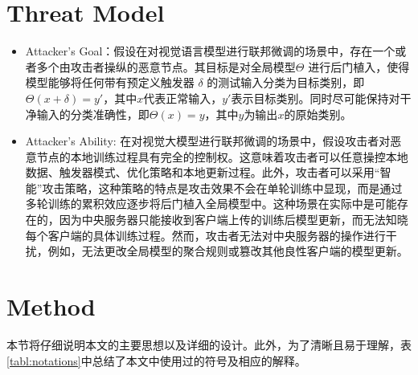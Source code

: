 \documentclass[lettersize,journal]{IEEEtran}
\begin{document}
\section{Threat Model}
\begin{itemize}
    \item Attacker's Goal：假设在对视觉语言模型进行联邦微调的场景中，存在一个或者多个由攻击者操纵的恶意节点。其目标是对全局模型$\Theta$ 进行后门植入，使得模型能够将任何带有预定义触发器 $\delta$ 的测试输入分类为目标类别，即$\Theta(x+\delta) = y'$，其中$x$代表正常输入，$y'$表示目标类别。同时尽可能保持对干净输入的分类准确性，即$\Theta(x) = y$，其中$y$为输出$x$的原始类别。
    \item Attacker's Ability: 在对视觉大模型进行联邦微调的场景中，假设攻击者对恶意节点的本地训练过程具有完全的控制权。这意味着攻击者可以任意操控本地数据、触发器模式、优化策略和本地更新过程。此外，攻击者可以采用“智能”攻击策略，这种策略的特点是攻击效果不会在单轮训练中显现，而是通过多轮训练的累积效应逐步将后门植入全局模型中。这种场景在实际中是可能存在的，因为中央服务器只能接收到客户端上传的训练后模型更新，而无法知晓每个客户端的具体训练过程。然而，攻击者无法对中央服务器的操作进行干扰，例如，无法更改全局模型的聚合规则或篡改其他良性客户端的模型更新。
\end{itemize}

\section{Method}
本节将仔细说明本文的主要思想以及详细的设计。此外，为了清晰且易于理解，表\ref{tabl:notations}中总结了本文中使用过的符号及相应的解释。
\end{document}

